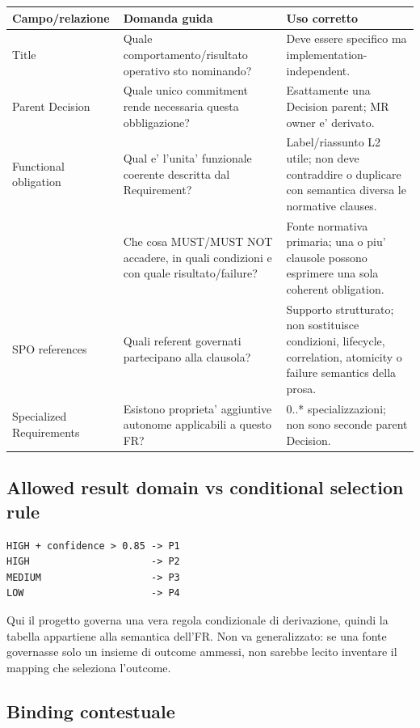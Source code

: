 \documentclass[11pt,a4paper]{article}
\begin{document}
\begin{longtable}{L{38mm}L{47mm}L{58mm}}
\toprule
\textbf{Campo/relazione} & \textbf{Domanda guida} & \textbf{Uso corretto} \\
\midrule\endhead
Title & Quale comportamento/risultato operativo sto nominando? & Deve essere specifico ma implementation-independent. \\
Parent Decision & Quale unico commitment rende necessaria questa obbligazione? & Esattamente una Decision parent; MR owner e' derivato. \\
Functional obligation & Qual e' l'unita' funzionale coerente descritta dal Requirement? & Label/riassunto L2 utile; non deve contraddire o duplicare con semantica diversa le normative clauses. \\
\NC{} & Che cosa MUST/MUST NOT accadere, in quali condizioni e con quale risultato/failure? & Fonte normativa primaria; una o piu' clausole possono esprimere una sola coherent obligation. \\
SPO references & Quali referent governati partecipano alla clausola? & Supporto strutturato; non sostituisce condizioni, lifecycle, correlation, atomicity o failure semantics della prosa. \\
Specialized Requirements & Esistono proprieta' aggiuntive autonome applicabili a questo FR? & 0..* specializzazioni; non sono seconde parent Decision. \\
\bottomrule
\end{longtable}

\subsection{Allowed result domain vs conditional selection rule}

\begin{ddtaexample}[title={DermaTriage - FR-02 come mapping governato}]
\begin{lstlisting}
HIGH + confidence > 0.85 -> P1
HIGH                     -> P2
MEDIUM                   -> P3
LOW                      -> P4
\end{lstlisting}
Qui il progetto governa una vera regola condizionale di derivazione, quindi la tabella appartiene alla semantica dell'FR. Non va generalizzato: se una fonte governasse solo un insieme di outcome ammessi, non sarebbe lecito inventare il mapping che seleziona l'outcome.
\end{ddtaexample}

\subsection{Binding contestuale}
\end{document}
